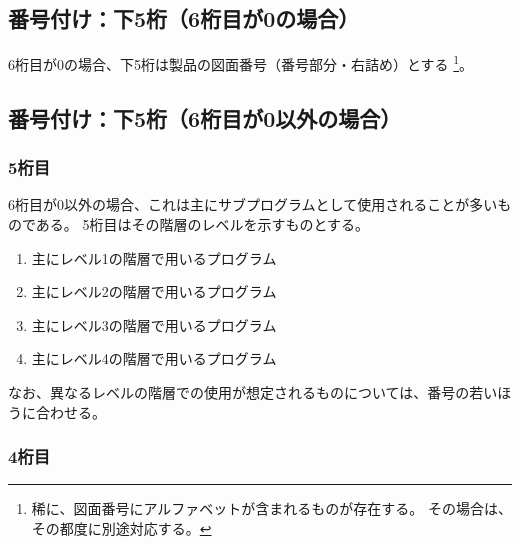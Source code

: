 \subsection{番号付け：下5桁（6桁目が0の場合）}
6桁目が0の場合、下5桁は製品の図面番号（番号部分・右詰め）とする
\footnote{稀に、図面番号にアルファベットが含まれるものが存在する。
その場合は、その都度に別途対応する。}。



\subsection{番号付け：下5桁（6桁目が0以外の場合）}



\subsubsection{5桁目}
6桁目が0以外の場合、これは主にサブプログラムとして使用されることが多いものである。
5桁目はその階層のレベルを示すものとする。
\begin{enumerate}[start=1]
\item 主にレベル1の階層で用いるプログラム
\item 主にレベル2の階層で用いるプログラム
\item 主にレベル3の階層で用いるプログラム
\item 主にレベル4の階層で用いるプログラム
\end{enumerate}
なお、異なるレベルの階層での使用が想定されるものについては、番号の若いほうに合わせる。



\subsubsection{4桁目}



